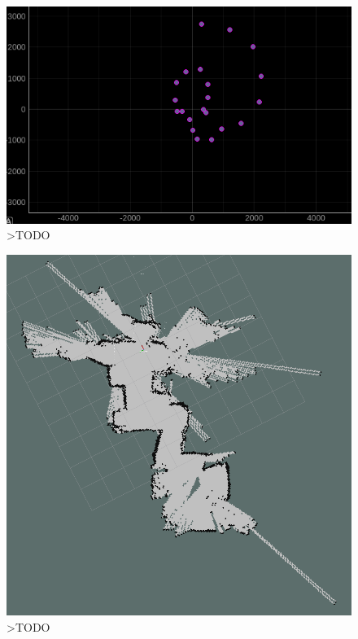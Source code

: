 

\begin{figure}[ht]
	\centering
		\includegraphics[width=0.8\linewidth]{rys/calibrated-mag-high-interference-broken-rotation.PNG}
	\caption{>TODO}
	\label{fig:xxx}
\end{figure}

\begin{figure}[ht]
	\centering
		\includegraphics[width=0.8\linewidth]{rys/2020-11-04-170347_1920x1080_scrot.PNG}
	\caption{>TODO}
	\label{fig:xxx}
\end{figure}



